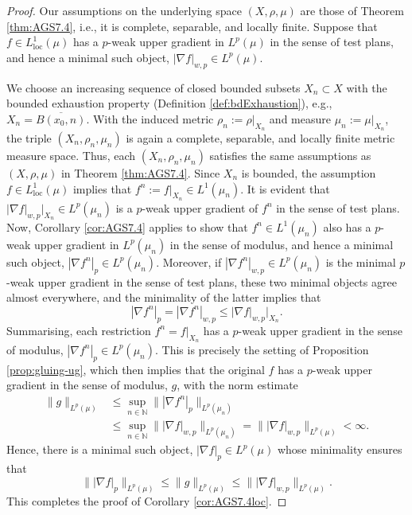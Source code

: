 \documentclass[11pt]{amsart}
\theoremstyle{definition}
\theoremstyle{remark}
\numberwithin{equation}{section}
\newcommand{\abs}[1]{|#1|}
\newcommand{\Norm}[2]{\|#1\|_{#2}}
\begin{document}
\begin{proof}
Our assumptions on the underlying space $(X,\rho,\mu)$ are those of Theorem
\ref{thm:AGS7.4}, i.e., it is complete, separable, and locally finite.
Suppose that $f\in L^1_{\mathrm{loc}}(\mu)$ has a $p$-weak upper gradient in $L^p(\mu)$ in
the sense of test plans, and hence a minimal such object, $\abs{\nabla f}_{w,p}\in
L^p(\mu)$.

We choose an increasing sequence of closed bounded subsets $X_n\subset X$ with the bounded
exhaustion property (Definition \ref{def:bdExhaustion}),
 e.g., $X_n=\overline{B(x_0,n)}$. With the induced metric $\rho_n:=\rho|_{X_n}$ and measure
 $\mu_n:=\mu|_{X_n}$, the triple $(X_n,\rho_n,\mu_n)$ is again a complete, separable, and
 locally finite metric measure space. Thus, each $(X_n,\rho_n,\mu_n)$ satisfies the same
 assumptions as $(X,\rho,\mu)$ in Theorem \ref{thm:AGS7.4}. Since $X_n$ is bounded, the
 assumption $f\in L^1_{\mathrm{loc}}(\mu)$ implies that $f^n:=f|_{X_n}\in L^1(\mu_n)$. It is
 evident that $\abs{\nabla f}_{w,p}|_{X_n}\in L^p(\mu_n)$ is a $p$-weak upper gradient of
 $f^n$ in the sense of test plans. Now, Corollary \ref{cor:AGS7.4} applies to show that
 $f^n\in L^1(\mu_n)$ also has a $p$-weak upper gradient in $L^p(\mu_n)$ in the sense of
 modulus, and hence a minimal such object, $\abs{\nabla f^n}_p\in L^p(\mu_n)$. Moreover, if
 $\abs{\nabla f^n}_{w,p}\in L^p(\mu_n)$ is the minimal $p$-weak upper gradient in the sense
 of test plans, these two minimal objects agree almost everywhere, and the minimality of the
 latter implies that
\begin{equation*}
  \abs{\nabla f^n}_{p}=\abs{\nabla f^n}_{w,p}\leq\abs{\nabla f}_{w,p}|_{X_n}.
\end{equation*}
Summarising, each restriction $f^n=f|_{X_n}$ has a $p$-weak upper gradient in the sense of
modulus, $\abs{\nabla f^n}_{p}\in L^p(\mu_n)$. This is precisely the setting of Proposition
\ref{prop:gluing-ug}, which then implies that the original $f$ has a $p$-weak upper gradient
in the sense of modulus, $g$, with the norm estimate
\begin{equation*}
\begin{split}
  \Norm{g}{L^p(\mu)}
  &\leq\sup_{n\in\mathbb N}\Norm{\abs{\nabla f^n}_p}{L^p(\mu_n)} \\
  &\leq\sup_{n\in\mathbb N}\Norm{\abs{\nabla f}_{w,p}}{L^p(\mu_n)}
  =\Norm{\abs{\nabla f}_{w,p}}{L^p(\mu)}<\infty.
\end{split}
\end{equation*}
Hence, there is a minimal such object, $\abs{\nabla f}_p\in L^p(\mu)$ whose minimality
ensures that
\begin{equation*}
 \Norm{\abs{\nabla f}_p}{L^p(\mu)}
  \leq\Norm{g}{L^p(\mu)}
  \leq\Norm{\abs{\nabla f}_{w,p}}{L^p(\mu)}.
\end{equation*}
This completes the proof of Corollary \ref{cor:AGS7.4loc}.
\end{proof}
\end{document}
